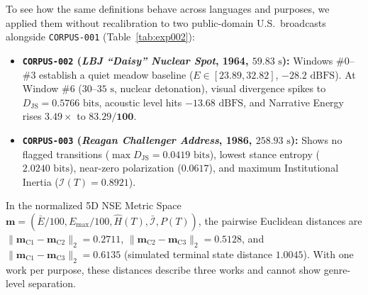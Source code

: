 \documentclass[10pt,letterpaper]{article}
\begin{document}
To see how the same definitions behave across languages and purposes, we applied them without recalibration to two public-domain U.S.\ broadcasts alongside \texttt{CORPUS-001} (Table~\ref{tab:exp002}):
\begin{itemize}
  \item \textbf{\texttt{CORPUS-002} (\emph{LBJ ``Daisy'' Nuclear Spot}, 1964, $59.83\text{ s}$):} Windows \#0--\#3 establish a quiet meadow baseline ($E \in [23.89, 32.82]$, $-28.2\text{ dBFS}$). At Window \#6 ($30\text{--}35\text{ s}$, nuclear detonation), visual divergence spikes to $D_{\mathrm{JS}} = 0.5766\text{ bits}$, acoustic level hits $-13.68\text{ dBFS}$, and Narrative Energy rises $3.49\times$ to $\mathbf{83.29/100}$.
  \item \textbf{\texttt{CORPUS-003} (\emph{Reagan Challenger Address}, 1986, $258.93\text{ s}$):} Shows no flagged transitions ($\max D_{\mathrm{JS}} = 0.0419\text{ bits}$), lowest stance entropy ($2.0240\text{ bits}$), near-zero polarization ($0.0617$), and maximum Institutional Inertia ($\mathcal{I}(T) = 0.8921$).
\end{itemize}
In the normalized 5D NSE Metric Space $\mathbf{m} = (\bar{E}/100, E_{\max}/100, \hat{H}(T), \bar{\mathcal{I}}, P(T))$, the pairwise Euclidean distances are $\|\mathbf{m}_{\mathrm{C1}} - \mathbf{m}_{\mathrm{C2}}\|_2 = 0.2711$, $\|\mathbf{m}_{\mathrm{C2}} - \mathbf{m}_{\mathrm{C3}}\|_2 = 0.5128$, and $\|\mathbf{m}_{\mathrm{C1}} - \mathbf{m}_{\mathrm{C3}}\|_2 = \mathbf{0.6135}$ (simulated terminal state distance $1.0045$). With one work per purpose, these distances describe three works and cannot show genre-level separation.
\end{document}
